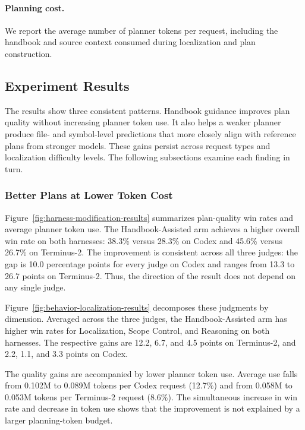 \documentclass[]{ailab}
\begin{document}
\paragraph{Planning cost.}
We report the average number of planner tokens per request, including the
handbook and source context consumed during localization and plan construction.

\subsection{Experiment Results}
\label{sec:exp-results}

The results show three consistent patterns. Handbook guidance improves plan
quality without increasing planner token use. It also helps a weaker planner
produce file- and symbol-level predictions that more closely align with
reference plans from stronger models. These gains persist across request types
and localization difficulty levels. The following subsections examine each
finding in turn.

\subsubsection{Better Plans at Lower Token Cost}
\label{sec:exp-modification}

Figure~\ref{fig:harness-modification-results} summarizes plan-quality win rates
and average planner token use. The Handbook-Assisted arm achieves a higher overall
win rate on both harnesses: 38.3\% versus 28.3\% on Codex and 45.6\% versus
26.7\% on Terminus-2. The improvement is consistent across all three judges: the
gap is 10.0 percentage points for every judge on Codex and ranges from 13.3 to
26.7 points on Terminus-2. Thus, the direction of the result does not depend on
any single judge.

Figure~\ref{fig:behavior-localization-results} decomposes these judgments by
dimension. Averaged across the three judges, the Handbook-Assisted arm has
higher win rates for Localization, Scope Control, and Reasoning on both
harnesses. The respective gains are 12.2, 6.7, and 4.5 points on Terminus-2,
and 2.2, 1.1, and 3.3 points on Codex.

The quality gains are accompanied by lower planner token use. Average use falls
from 0.102M to 0.089M tokens per Codex request (12.7\%) and from 0.058M to
0.053M tokens per Terminus-2 request (8.6\%). The simultaneous increase in win
rate and decrease in token use shows that the improvement is not explained by a
larger planning-token budget.
\end{document}

